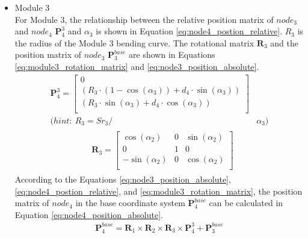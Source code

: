 \begin{itemize}
    \item Module 3 \\
    For Module 3, the relationship between the relative position matrix of $node_3$ and $node_4$ $\textbf{P}_{4}^{3}$ 
    and $\alpha_3$ is shown in Equation \ref{eq:node4_postion_relative}. $R_3$ is the radius of the Module 3 bending 
    curve. The rotational matrix $\textbf{R}_{3}$ and the position matrix of $node_3$ $\textbf{P}_{3}^{base}$ are shown 
    in Equations \ref*{eq:module3_rotation_matrix} and \ref{eq:node3_position_absolute}.
    \begin{align}
        \textbf{P}_{4}^{3} = 
        \begin{bmatrix}
            0 \\
            (R_3\cdot(1-\cos(\alpha_3)) + d_4\cdot \sin(\alpha_3)) \\
            (R_3\cdot \sin(\alpha_3) + d_4\cdot \cos(\alpha_3)) \\
        \end{bmatrix}&
        \label{eq:node4_postion_relative} \\
        \nonumber (hint: \ R_3 = {Sr}_3/ &\alpha_3)
    \end{align}
    \vspace{-15mm}
    \begin{align}
        &\begin{aligned}
            \textbf{R}_{3} = 
            \begin{bmatrix}
                \cos(\alpha_2) & 0 & \sin(\alpha_2) \\
                0 & 1 & 0 \\
                -\sin(\alpha_2) & 0 & \cos(\alpha_2) \\
            \end{bmatrix}
        \end{aligned}
        \label{eq:module3_rotation_matrix}
    \end{align}
    According to the Equations \ref{eq:node3_position_absolute}, \ref{eq:node4_postion_relative}, and 
    \ref*{eq:module3_rotation_matrix}, the position matrix of $node_{4}$ in the base coordinate system 
    $\textbf{P}_{4}^{base}$ can be calculated in Equation \ref{eq:node4_position_absolute}.
    \begin{align}
        \textbf{P}_{4}^{base} = \textbf{R}_{1} \times\textbf{R}_{2} 
        \times\textbf{R}_{3} \times \textbf{P}_{4}^{3} + \textbf{P}_{3}^{base}
        \label{eq:node4_position_absolute}
    \end{align}

\end{itemize}
